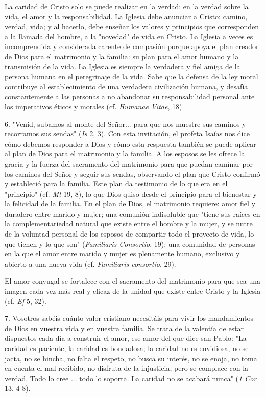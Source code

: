 \begin{body}
\begin{body}
La caridad de Cristo solo se puede realizar en la verdad: en la verdad sobre la vida, el amor y la responsabilidad. La Iglesia debe anunciar a Cristo: camino, verdad, vida; y al hacerlo, debe enseñar los valores y principios que corresponden a la llamada del hombre, a la "novedad" de vida en Cristo. La Iglesia a veces es incomprendida y considerada carente de compasión porque apoya el plan creador de Dios para el matrimonio y la familia: su plan para el amor humano y la transmisión de la vida. La Iglesia es siempre la verdadera y fiel amiga de la persona humana en el peregrinaje de la vida. Sabe que la defensa de la ley moral contribuye al establecimiento de una verdadera civilización humana, y desafía constantemente a las personas a no abandonar su responsabilidad personal ante los imperativos éticos y morales (cf. \href{http://www.vatican.va/content/paul-vi/it/encyclicals/documents/hf_p-vi_enc_25071968_humanae-vitae.html}{\emph{\emph{Humanae Vitae}}}, 18).

6. "Venid, subamos al monte del Señor... para que nos muestre sus caminos y recorramos sus sendas" (\emph{Is} 2, 3). Con esta invitación, el profeta Isaías nos dice cómo debemos responder a Dios y cómo esta respuesta también se puede aplicar al plan de Dios para el matrimonio y la familia. A los esposos se les ofrece la gracia y la fuerza del sacramento del matrimonio para que puedan caminar por los caminos del Señor y seguir sus sendas, observando el plan que Cristo confirmó y estableció para la familia. Este plan da testimonio de lo que era en el "principio" (cf. \emph{Mt} 19, 8), lo que Dios quiso desde el principio para el bienestar y la felicidad de la familia. En el plan de Dios, el matrimonio requiere: amor fiel y duradero entre marido y mujer; una comunión indisoluble que "tiene sus raíces en la complementariedad natural que existe entre el hombre y la mujer, y se nutre de la voluntad personal de los esposos de compartir todo el proyecto de vida, lo que tienen y lo que son" (\emph{Familiaris Consortio}, 19); una comunidad de personas en la que el amor entre marido y mujer es plenamente humano, exclusivo y abierto a una nueva vida (cf. \emph{Familiaris consortio}, 29).

El amor conyugal se fortalece con el sacramento del matrimonio para que sea una imagen cada vez más real y eficaz de la unidad que existe entre Cristo y la Iglesia (cf. \emph{Ef} 5, 32).

7. Vosotros sabéis cuánto valor cristiano necesitáis para vivir los mandamientos de Dios en vuestra vida y en vuestra familia. Se trata de la valentía de estar dispuestos cada día a construir el amor, ese amor del que dice san Pablo: "La caridad es paciente, la caridad es bondadosa; la caridad no es envidiosa, no se jacta, no se hincha, no falta el respeto, no busca su interés, no se enoja, no toma en cuenta el mal recibido, no disfruta de la injusticia, pero se complace con la verdad. Todo lo cree ... todo lo soporta. La caridad no se acabará nunca" (\emph{1 Cor} 13, 4-8).


\end{body}
\end{body}
